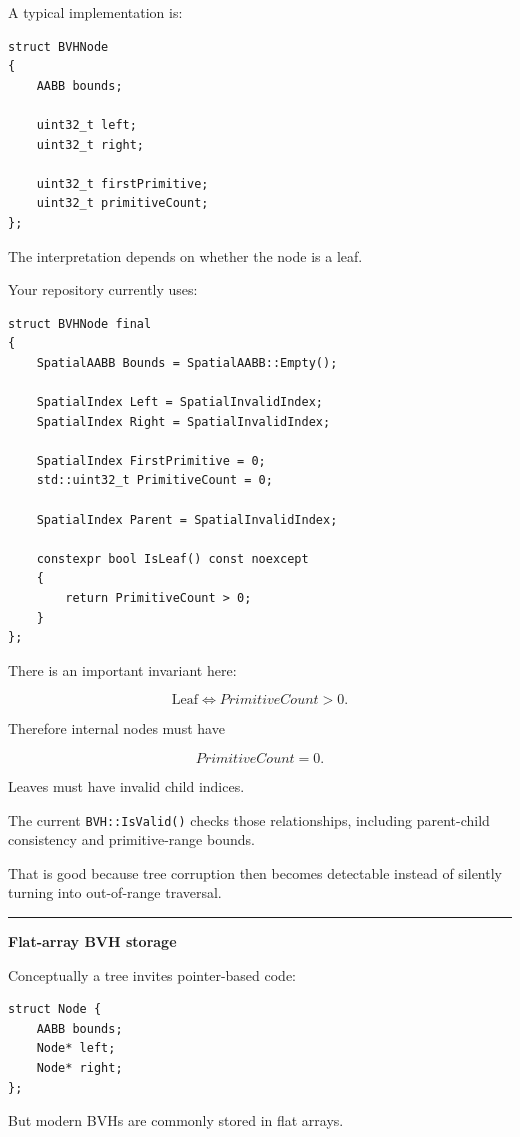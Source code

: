 A typical implementation is:

\begin{verbatim}
struct BVHNode
{
    AABB bounds;

    uint32_t left;
    uint32_t right;

    uint32_t firstPrimitive;
    uint32_t primitiveCount;
};
\end{verbatim}

The interpretation depends on whether the node is a leaf.

Your repository currently uses:

\begin{verbatim}
struct BVHNode final
{
    SpatialAABB Bounds = SpatialAABB::Empty();

    SpatialIndex Left = SpatialInvalidIndex;
    SpatialIndex Right = SpatialInvalidIndex;

    SpatialIndex FirstPrimitive = 0;
    std::uint32_t PrimitiveCount = 0;

    SpatialIndex Parent = SpatialInvalidIndex;

    constexpr bool IsLeaf() const noexcept
    {
        return PrimitiveCount > 0;
    }
};
\end{verbatim}

There is an important invariant here:

\[
\text{Leaf}\iff PrimitiveCount>0.
\]

Therefore internal nodes must have

\[
PrimitiveCount=0.
\]

Leaves must have invalid child indices.

The current \texttt{BVH::IsValid()} checks those relationships, including parent-child consistency and primitive-range bounds.

That is good because tree corruption then becomes detectable instead of silently turning into out-of-range traversal.

\begin{center}\rule{0.5\linewidth}{0.5pt}\end{center}

\textbf{Flat-array BVH storage}

Conceptually a tree invites pointer-based code:

\begin{verbatim}
struct Node {
    AABB bounds;
    Node* left;
    Node* right;
};
\end{verbatim}

But modern BVHs are commonly stored in flat arrays.

